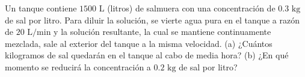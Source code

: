 \item Un tanque contiene $1500 \text{ L}$ (litros) de salmuera con una concentración de $0.3 \text{ kg}$ de sal por litro. Para diluir la solución, se vierte agua pura en el tanque a razón de $20 \text{ L/min}$ y la solución resultante, la cual se mantiene continuamente mezclada, sale al exterior del tanque a la misma velocidad. (a) ¿Cuántos kilogramos de sal quedarán en el tanque al cabo de media hora? (b) ¿En qué momento se reducirá la concentración a $0.2 \text{ kg}$ de sal por litro?
